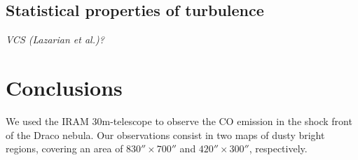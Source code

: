 \documentclass[traditabstract]{aa}
\begin{document}
   \subsection{Statistical properties of turbulence}
   \textit{VCS (Lazarian et al.)?}




\section{Conclusions}
\label{sec:conclusion}

   We used the IRAM 30m-telescope to observe the CO emission in the shock front of the Draco nebula. Our observations consist in two maps of dusty bright regions, covering an area of $830''\times 700''$ and $420''\times 300''$, respectively.

%
\end{document}
